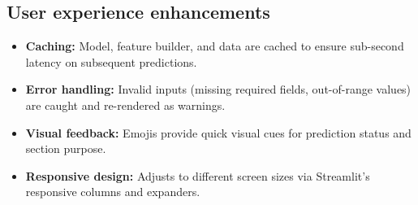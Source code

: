 \subsection{User experience enhancements}

\begin{itemize}
  \item \textbf{Caching:} Model, feature builder, and data are cached to ensure sub-second latency on subsequent predictions.
  \item \textbf{Error handling:} Invalid inputs (missing required fields, out-of-range values) are caught and re-rendered as warnings.
  \item \textbf{Visual feedback:} Emojis provide quick visual cues for prediction status and section purpose.
  \item \textbf{Responsive design:} Adjusts to different screen sizes via Streamlit's responsive columns and expanders.
\end{itemize}
